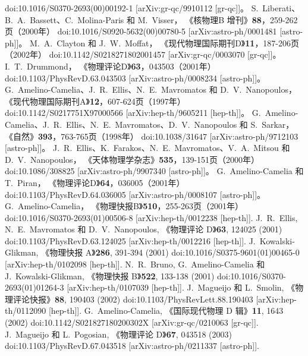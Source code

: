 \documentclass[jkps,preprint,fleqn]{revtex4}
\begin{document}
\begin{CJK*}{UTF8}{gbsn}
\begin{thebibliography}{999}
doi:10.1016/S0370-2693(00)00192-1
[arXiv:gr-qc/9910112 [gr-qc]]。
S.~Liberati、B.~A.~Bassett、C.~Molina-Paris 和 M.~Visser，
《核物理B 增刊》\textbf{88}，259-262页（2000年）
doi:10.1016/S0920-5632(00)00780-5
[arXiv:astro-ph/0001481 [astro-ph]]。
M.~A.~Clayton 和 J.~W.~Moffat，
《现代物理国际期刊D》\textbf{11}，187-206页（2002年）
doi:10.1142/S0218271802001457
[arXiv:gr-qc/0003070 [gr-qc]]。
I.~T.~Drummond，
《物理评论D》\textbf{63}，043503（2001年）
doi:10.1103/PhysRevD.63.043503
[arXiv:astro-ph/0008234 [astro-ph]]。
G.~Amelino-Camelia、J.~R.~Ellis、N.~E.~Mavromatos 和 D.~V.~Nanopoulos，
《现代物理国际期刊A》\textbf{12}，607-624页（1997年）
doi:10.1142/S0217751X97000566
[arXiv:hep-th/9605211 [hep-th]]。
G.~Amelino-Camelia、J.~R.~Ellis、N.~E.~Mavromatos、D.~V.~Nanopoulos 和 S.~Sarkar，
《自然》\textbf{393}，763-765页（1998年）
doi:10.1038/31647
[arXiv:astro-ph/9712103 [astro-ph]]。
J.~R.~Ellis、K.~Farakos、N.~E.~Mavromatos、V.~A.~Mitsou 和 D.~V.~Nanopoulos，
《天体物理学杂志》\textbf{535}，139-151页（2000年）
doi:10.1086/308825
[arXiv:astro-ph/9907340 [astro-ph]]。
G.~Amelino-Camelia 和 T.~Piran，
《物理评论D》\textbf{64}，036005（2001年）
doi:10.1103/PhysRevD.64.036005
[arXiv:astro-ph/0008107 [astro-ph]]。
G.~Amelino-Camelia，
《物理快报B》\textbf{510}，255-263页（2001年）
doi:10.1016/S0370-2693(01)00506-8
[arXiv:hep-th/0012238 [hep-th]].
J.~R.~Ellis, N.~E.~Mavromatos 和 D.~V.~Nanopoulos,
《物理评论 D》\textbf{63}, 124025 (2001)
doi:10.1103/PhysRevD.63.124025
[arXiv:hep-th/0012216 [hep-th]].
J.~Kowalski-Glikman,
《物理快报 A》\textbf{286}, 391-394 (2001)
doi:10.1016/S0375-9601(01)00465-0
[arXiv:hep-th/0102098 [hep-th]].
N.~R.~Bruno, G.~Amelino-Camelia 和 J.~Kowalski-Glikman,
《物理快报 B》\textbf{522}, 133-138 (2001)
doi:10.1016/S0370-2693(01)01264-3
[arXiv:hep-th/0107039 [hep-th]].
J.~Magueijo 和 L.~Smolin,
《物理评论快报》\textbf{88}, 190403 (2002)
doi:10.1103/PhysRevLett.88.190403
[arXiv:hep-th/0112090 [hep-th]].
G.~Amelino-Camelia,
《国际现代物理 D 辑》\textbf{11}, 1643 (2002)
doi:10.1142/S021827180200302X
[arXiv:gr-qc/0210063 [gr-qc]].
J.~Magueijo 和 L.~Pogosian,
《物理评论 D》\textbf{67}, 043518 (2003)
doi:10.1103/PhysRevD.67.043518
[arXiv:astro-ph/0211337 [astro-ph]].

\end{thebibliography}
\end{CJK*}
\end{document}
